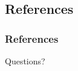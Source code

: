 \documentclass{beamer}
\begin{document}
	\subsection{References}
	\begin{frame}[allowframebreaks]
		\frametitle{References}
		
		
	\end{frame}

	\begin{frame}
	\Huge{\centerline{Questions?}}
	\end{frame}
\end{document}
